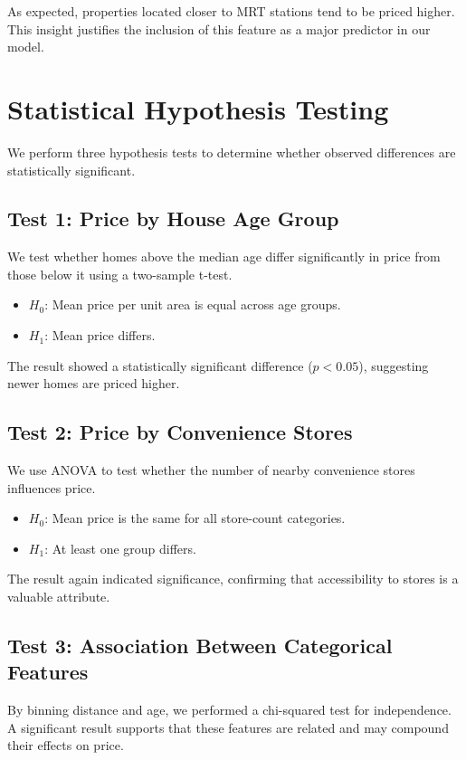 \documentclass[12pt]{article}
\begin{document}
As expected, properties located closer to MRT stations tend to be priced higher. This insight justifies the inclusion of this feature as a major predictor in our model.

\section{Statistical Hypothesis Testing}
We perform three hypothesis tests to determine whether observed differences are statistically significant.

\subsection{Test 1: Price by House Age Group}
We test whether homes above the median age differ significantly in price from those below it using a two-sample t-test.

\begin{itemize}
    \item $H_0$: Mean price per unit area is equal across age groups.
    \item $H_1$: Mean price differs.
\end{itemize}

The result showed a statistically significant difference ($p < 0.05$), suggesting newer homes are priced higher.

\subsection{Test 2: Price by Convenience Stores}
We use ANOVA to test whether the number of nearby convenience stores influences price.

\begin{itemize}
    \item $H_0$: Mean price is the same for all store-count categories.
    \item $H_1$: At least one group differs.
\end{itemize}

The result again indicated significance, confirming that accessibility to stores is a valuable attribute.

\subsection{Test 3: Association Between Categorical Features}
By binning distance and age, we performed a chi-squared test for independence. A significant result supports that these features are related and may compound their effects on price.
\end{document}
